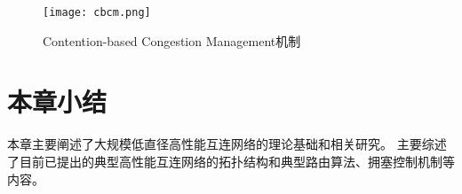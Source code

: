 \begin{figure}[htp]
  \centering
    \texttt{[image: cbcm.png]}
    \caption{Contention-based Congestion Management机制}
       \label{cbcm}
\end{figure}

\section{本章小结}
本章主要阐述了大规模低直径高性能互连网络的理论基础和相关研究。
主要综述了目前已提出的典型高性能互连网络的拓扑结构和典型路由算法、拥塞控制机制等内容。

